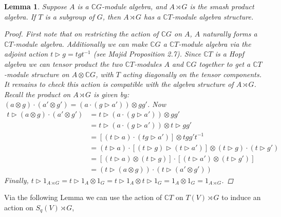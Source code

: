 \documentclass[10pt]{article}
\newcommand{\nt}{\noindent}
\newcommand{\Cc }{\mathbb{C}}
\newcommand{\cd}{\cdot}
\newtheorem{lemma}{Lemma}[section]
\theoremstyle{definition}
\begin{document}
\begin{lemma}\label{building_h_mod_algebras} Suppose $A$ is a $\Cc  G$-module algebra, and $A\rtimes G$ is the smash product algebra.  If $T$ is a subgroup of $G$, then $A\rtimes G$ has a $\Cc  T$-module algebra structure. 
\begin{proof}
First note that on restricting the action of $\Cc  G$ on $A$, $A$ naturally forms a $\Cc  T$-module algebra. Additionally we can make $\Cc  G$ a $\Cc  T$-module algebra via the adjoint action $t\rhd g=tgt^{-1}$ (see Majid \cite{alma9916633704401631} Proposition 2.7). Since $\Cc  T$ is a Hopf algebra we can tensor product the two $\Cc  T$-modules $A$ and $\Cc  G$ together to get a $\Cc  T$-module structure on $A\otimes \Cc  G$, with $T$ acting diagonally on the tensor components. It remains to check this action is compatible with the algebra structure of $A\rtimes G$. Recall the product on $A\rtimes G$ is given by: $(a\otimes g)\cd (a'\otimes g') = (a\cd (g\rhd a'))\otimes gg'$. Now
\begin{align*}
t\rhd (a\otimes g)\cd (a'\otimes g') & = t\rhd (a\cd (g\rhd a'))\otimes gg'\\
& = t\rhd (a\cd (g\rhd a')) \otimes t\rhd gg'\\
& = [(t\rhd a)\cd (tg\rhd a')]\otimes tgg't^{-1}\\
& = (t\rhd a)\cd [(t\rhd g)\rhd (t\rhd a')]\otimes (t\rhd g)\cd (t\rhd g')\\
& = [(t\rhd a)\otimes (t\rhd g)]\cd [(t\rhd a')\otimes (t\rhd g')]\\
& = (t\rhd (a\otimes g))\cd (t\rhd (a'\otimes g'))
\end{align*}
Finally, $t\rhd 1_{A\rtimes G}=t\rhd 1_A\otimes 1_G=t\rhd 1_A\otimes t\rhd 1_G=1_A\otimes 1_G=1_{A\rtimes G}$.
\end{proof}
\end{lemma}
\nt Via the following Lemma we can use the action of $\Cc  T$ on $T(V)\rtimes G$ to induce an action on $S_q(V)\rtimes G$,
\end{document}

